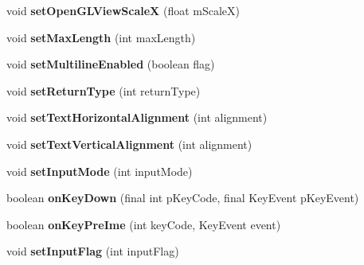 \begin{DoxyCompactItemize}
void {\bfseries set\+Open\+G\+L\+View\+ScaleX} (float m\+ScaleX)
\item 
\mbox{\label{classorg_1_1cocos2dx_1_1lib_1_1Cocos2dxEditBox_abda6f3fa4bf8a4481583aa9f68983fea}} 
void {\bfseries set\+Max\+Length} (int max\+Length)
\item 
\mbox{\label{classorg_1_1cocos2dx_1_1lib_1_1Cocos2dxEditBox_aa1a22ef0a71fdd572bd5f19ab7abe128}} 
void {\bfseries set\+Multiline\+Enabled} (boolean flag)
\item 
\mbox{\label{classorg_1_1cocos2dx_1_1lib_1_1Cocos2dxEditBox_a0ceecc237a28284160a9048a67577e29}} 
void {\bfseries set\+Return\+Type} (int return\+Type)
\item 
\mbox{\label{classorg_1_1cocos2dx_1_1lib_1_1Cocos2dxEditBox_af3b7b42b584d3ebb945a1557f1151e82}} 
void {\bfseries set\+Text\+Horizontal\+Alignment} (int alignment)
\item 
\mbox{\label{classorg_1_1cocos2dx_1_1lib_1_1Cocos2dxEditBox_a45ccab51a4c22fde4a40eaff678fd485}} 
void {\bfseries set\+Text\+Vertical\+Alignment} (int alignment)
\item 
\mbox{\label{classorg_1_1cocos2dx_1_1lib_1_1Cocos2dxEditBox_a8c5988624f8d0847cac4954f1a60c3e9}} 
void {\bfseries set\+Input\+Mode} (int input\+Mode)
\item 
\mbox{\label{classorg_1_1cocos2dx_1_1lib_1_1Cocos2dxEditBox_a977dc420dcaa8b34afaa94230071ecf7}} 
boolean {\bfseries on\+Key\+Down} (final int p\+Key\+Code, final Key\+Event p\+Key\+Event)
\item 
\mbox{\label{classorg_1_1cocos2dx_1_1lib_1_1Cocos2dxEditBox_aac0c09da511a252acb0edc7e81c2a370}} 
boolean {\bfseries on\+Key\+Pre\+Ime} (int key\+Code, Key\+Event event)
\item 
\mbox{\label{classorg_1_1cocos2dx_1_1lib_1_1Cocos2dxEditBox_ab8c46d40e9f2cc6759eff41c7ad548f5}} 
void {\bfseries set\+Input\+Flag} (int input\+Flag)
\end{DoxyCompactItemize}
